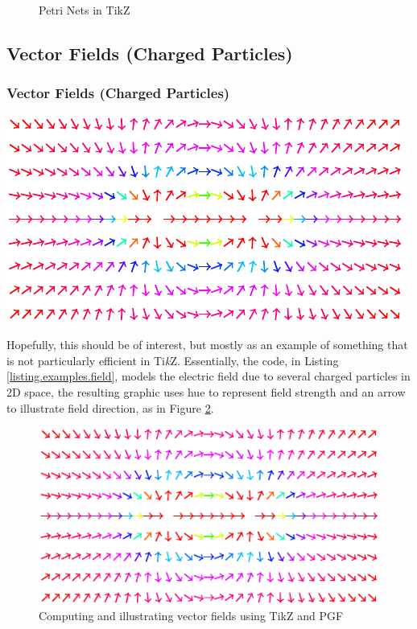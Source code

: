 \begin{figure}[btp]
	\centering
	\caption{Petri Nets in TikZ}
	\label{figure.examples.petri}
\end{figure}



\subsection{Vector Fields (Charged Particles)}

\begin{frame}
	\frametitle{Vector Fields (Charged Particles)}
	\begin{center}
		\includegraphics{examples.beamer/field-crop}
	\end{center}
\end{frame}
\mode*

Hopefully, this should be of interest, but mostly as an example of something that is not particularly efficient in Ti\emph{k}Z.
Essentially, the code, in Listing \ref{listing.examples.field}, models the electric field due to several charged particles in 2D space, the resulting graphic uses hue to represent field strength and an arrow to illustrate field direction, as in Figure \ref{figure.examples.fields}.

\begin{figure}[btp]
	\centering
	\includegraphics{examples.beamer/field-crop}
	\caption{Computing and illustrating vector fields using TikZ and PGF}
	\label{figure.examples.fields}
\end{figure}


